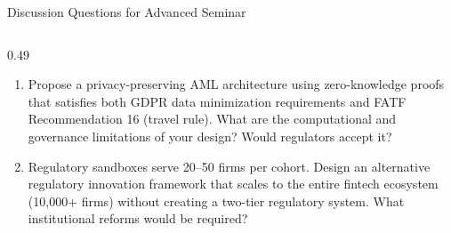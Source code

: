 \begin{frame}{Discussion Questions for Advanced Seminar}
\begin{columns}[T]
\begin{column}{0.49\textwidth}
\begin{enumerate}
        \item Propose a privacy-preserving AML architecture using zero-knowledge proofs that satisfies both GDPR data minimization requirements and FATF Recommendation 16 (travel rule). What are the computational and governance limitations of your design? Would regulators accept it?
        \item Regulatory sandboxes serve 20--50 firms per cohort. Design an alternative regulatory innovation framework that scales to the entire fintech ecosystem (10,000+ firms) without creating a two-tier regulatory system. What institutional reforms would be required?
      \end{enumerate}
    \end{column}
  \end{columns}
\end{frame}


